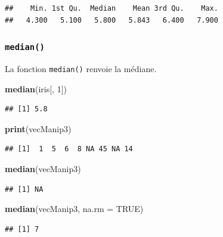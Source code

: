 \documentclass[
]{book}
\newenvironment{Shaded}{\begin{snugshade}}{\end{snugshade}}
\newcommand{\DataTypeTok}[1]{\textcolor[rgb]{0.13,0.29,0.53}{#1}}
\newcommand{\DecValTok}[1]{\textcolor[rgb]{0.00,0.00,0.81}{#1}}
\newcommand{\KeywordTok}[1]{\textcolor[rgb]{0.13,0.29,0.53}{\textbf{#1}}}
\newcommand{\NormalTok}[1]{#1}
\newcommand{\OtherTok}[1]{\textcolor[rgb]{0.56,0.35,0.01}{#1}}
\begin{document}
\begin{verbatim}
##    Min. 1st Qu.  Median    Mean 3rd Qu.    Max. 
##   4.300   5.100   5.800   5.843   6.400   7.900
\end{verbatim}

\hypertarget{l015median}{%
\subsubsection{\texorpdfstring{\texttt{median()}}{median()}}\label{l015median}}

La fonction \texttt{median()} renvoie la médiane.

\begin{Shaded}
\begin{Highlighting}[]
\KeywordTok{median}\NormalTok{(iris[, }\DecValTok{1}\NormalTok{])}
\end{Highlighting}
\end{Shaded}

\begin{verbatim}
## [1] 5.8
\end{verbatim}

\begin{Shaded}
\begin{Highlighting}[]
\KeywordTok{print}\NormalTok{(vecManip3)}
\end{Highlighting}
\end{Shaded}

\begin{verbatim}
## [1]  1  5  6  8 NA 45 NA 14
\end{verbatim}

\begin{Shaded}
\begin{Highlighting}[]
\KeywordTok{median}\NormalTok{(vecManip3)}
\end{Highlighting}
\end{Shaded}

\begin{verbatim}
## [1] NA
\end{verbatim}

\begin{Shaded}
\begin{Highlighting}[]
\KeywordTok{median}\NormalTok{(vecManip3, }\DataTypeTok{na.rm =} \OtherTok{TRUE}\NormalTok{)}
\end{Highlighting}
\end{Shaded}

\begin{verbatim}
## [1] 7
\end{verbatim}
\end{document}
